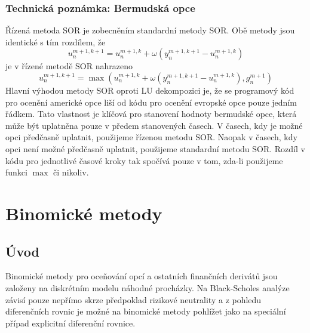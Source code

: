 \documentclass[a4paper]{book}
\begin{document}
\subsection{Technická poznámka: Bermudská opce}

Řízená metoda SOR je zobecněním standardní metody SOR. Obě metody jsou identické s tím rozdílem, že
\begin{equation*}
u_n^{m+1, k+1} = u_n^{m+1, k} + \omega(y_n^{m+1, k+1} - u_n^{m+1, k})
\end{equation*}
je v řízené metodě SOR nahrazeno
\begin{equation*}
u_n^{m+1, k+1} = \max (u_n^{m+1, k} + \omega(y_n^{m+1, k+1} - u_n^{m+1, k}), g_n^{m+1})
\end{equation*}
Hlavní výhodou metody SOR oproti LU dekompozici je, že se programový kód pro ocenění americké opce liší od kódu pro ocenění evropské opce pouze jedním řádkem. Tato vlastnost je klíčová pro stanovení hodnoty bermudské opce, která může být uplatněna pouze v předem stanovených časech. V časech, kdy je možné opci předčasně uplatnit, použijeme řízenou metodu SOR. Naopak v časech, kdy opci není možné předčasně uplatnit, použijeme standardní metodu SOR. Rozdíl v kódu pro jednotlivé časové kroky tak spočívá pouze v tom, zda-li použijeme funkci $\max$ či nikoliv.

\chapter{Binomické metody}

\section{Úvod}

Binomické metody pro oceňování opcí a ostatních finančních derivátů jsou založeny na diskrétním modelu náhodné procházky. Na Black-Scholes analýze závisí pouze nepřímo skrze předpoklad rizikové neutrality a z pohledu diferenčních rovnic je možné na binomické metody pohlížet jako na speciální případ explicitní diferenční rovnice.
\end{document}
